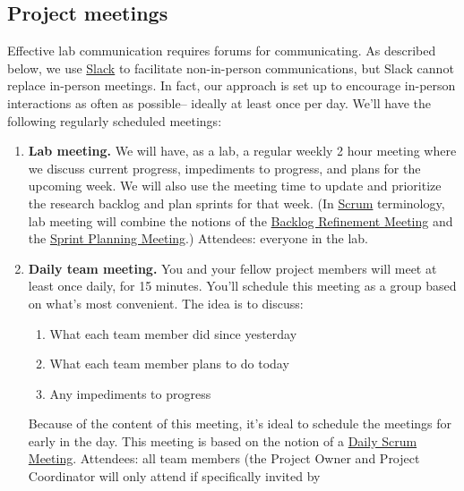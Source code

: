 \documentclass{tufte-book} %
\begin{document}
\subsection{Project meetings}
Effective lab communication requires forums for communicating.  As
described below, we use \href{http://www.slack.com}{Slack} to
facilitate non-in-person communications, but Slack cannot replace
in-person meetings.  In fact, our approach is set up to encourage
in-person interactions as often as possible-- ideally at least once
per day.  We'll have the following regularly scheduled meetings:
\begin{enumerate}
\item \textbf{Lab meeting.}  We will have, as a lab, a regular weekly
  2 hour meeting where we discuss current progress, impediments to
  progress, and plans for the upcoming week.  We will also use the
  meeting time to update and prioritize the research
  backlog and plan sprints for
  that week.  (In \href{http://scrumtrainingseries.com/}{Scrum}
  terminology, lab meeting will combine the notions of the
  \href{http://scrumtrainingseries.com/BacklogRefinementMeeting/BacklogRefinementMeeting.htm}{Backlog
    Refinement Meeting} and the
  \href{http://scrumtrainingseries.com/SprintPlanningMeeting/SprintPlanningMeeting.htm}{Sprint
    Planning Meeting}.)  Attendees: everyone in the lab.
\item \textbf{Daily team meeting.}  You and your fellow project
  members will meet at least once daily, for 15 minutes.  You'll
  schedule this meeting as a group based on what's most convenient.
  The idea is to discuss:
\begin{enumerate}
\item What each team member did since yesterday
\item What each team member plans to do today
\item Any impediments to progress
\end{enumerate}
Because of the content of this meeting, it's ideal to schedule the
meetings for early in the day.  This meeting is based on the notion of
a
\href{http://scrumtrainingseries.com/DailyScrumMeeting/DailyScrumMeeting.htm}{Daily
  Scrum Meeting}. Attendees: all team members (the Project Owner
and Project Coordinator will only attend if specifically invited by

\end{enumerate}
\end{document}
